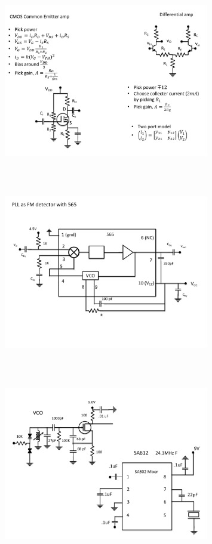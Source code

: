 \begin{figure} 
\center
\includegraphics[width=0.8\textwidth,natwidth=642,natheight=610, height=80mm, width=88mm]{circuit17.pdf}
\end{figure}
\begin{figure} 
\center
\includegraphics[width=0.8\textwidth,natwidth=642,natheight=610, height=80mm, width=88mm]{circuit18.pdf}
\end{figure}
\begin{figure} 
\center
\includegraphics[width=0.8\textwidth,natwidth=642,natheight=610, height=80mm, width=88mm]{circuit19.pdf}
\end{figure}
